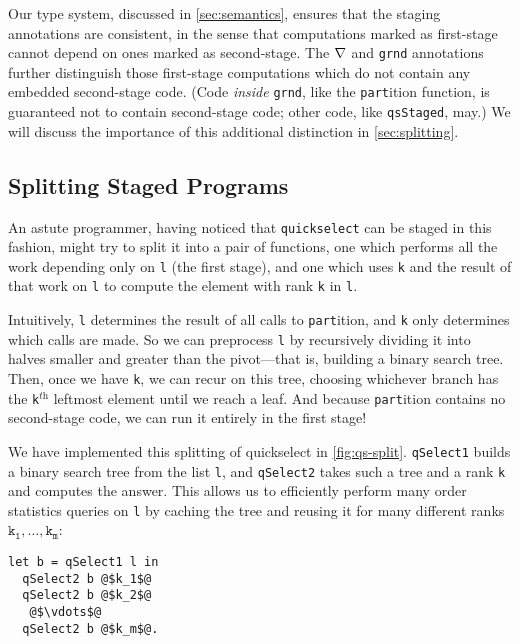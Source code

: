 \begin{abstrsyn}
Our type system, discussed in \ref{sec:semantics}, ensures that the staging
annotations are consistent, in the sense that computations marked as
first-stage cannot depend on ones marked as second-stage. The $\nabla$ and
\texttt{grnd} annotations further distinguish those first-stage computations
which do not contain any embedded second-stage code. (Code \emph{inside}
\texttt{grnd}, like the \texttt{part}ition function, is guaranteed not to
contain second-stage code; other code, like \texttt{qsStaged}, may.) We will
discuss the importance of this additional distinction in \ref{sec:splitting}.

\subsection{Splitting Staged Programs}



An astute programmer, having noticed that \texttt{quickselect} can be staged in
this fashion, might try to split it into a pair of functions, one which performs
all the work depending only on \texttt{l} (the first stage), and one which uses
\texttt{k} and the result of that work on \texttt{l} to compute the element with
rank \texttt{k} in \texttt{l}. 

Intuitively, \texttt{l} determines the result of all calls to
\texttt{part}ition, and \texttt{k} only determines which calls are made. So we
can preprocess \texttt{l} by recursively dividing it into halves smaller and
greater than the pivot---that is, building a binary search tree. Then, once we
have \texttt{k}, we can recur on this tree, choosing whichever branch has the
\texttt{k}${}^\textit{th}$ leftmost element until we reach a leaf. And because
\texttt{part}ition contains no second-stage code, we can run it entirely in the
first stage!

We have implemented this splitting of quickselect in \ref{fig:qs-split}.
\texttt{qSelect1} builds a binary search tree from the list \texttt{l}, and
\texttt{qSelect2} takes such a tree and a rank \texttt{k} and computes the
answer. This allows us to efficiently perform many order statistics queries on
\texttt{l} by caching the tree and reusing it for many different ranks
$\mathtt{k_1},\dots,\mathtt{k_m}$:
%
\begin{lstlisting}
let b = qSelect1 l in
  qSelect2 b @$k_1$@
  qSelect2 b @$k_2$@
   @$\vdots$@ 
  qSelect2 b @$k_m$@.
\end{lstlisting}


\end{abstrsyn}
